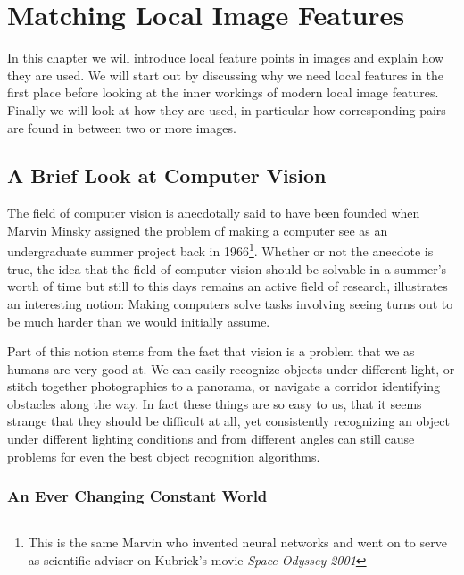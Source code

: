 \chapter{Matching Local Image Features}
\label{C:Background}


In this chapter we will introduce local feature points in images and 
explain how they are used. We will start out by discussing why we need 
local features in the first place before looking at the inner workings 
of modern local image features. Finally we will look at how they are 
used, in particular how corresponding pairs are found in between two or 
more images.

\section{A Brief Look at Computer Vision}

The field of computer vision is anecdotally said to have been founded 
when Marvin Minsky assigned the problem of making a computer see as an 
undergraduate summer project back in 1966\footnote{This is the same 
Marvin who invented neural networks and went on to serve as scientific 
adviser on Kubrick's movie \emph{Space Odyssey 2001}}. Whether or not 
the anecdote is true, the idea that the field of computer vision should 
be solvable in a summer's worth of time but still to this days remains 
an active field of research, illustrates an interesting notion: Making 
computers solve tasks involving seeing turns out to be much harder than 
we would initially assume.

Part of this notion stems from the fact that vision is a problem that we 
as humans are very good at. We can easily recognize objects under 
different light, or stitch together photographies to a panorama, or 
navigate a corridor identifying obstacles along the way. In fact these 
things are so easy to us, that it seems strange that they should be 
difficult at all, yet consistently recognizing an object under different 
lighting conditions and from different angles can still cause problems 
for even the best object recognition algorithms.

\subsection{An Ever Changing Constant World}

